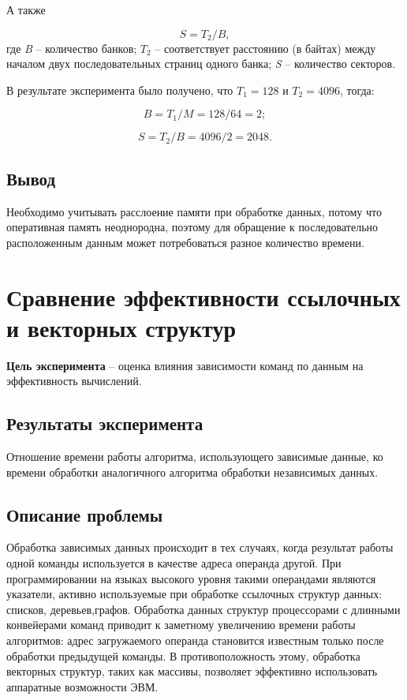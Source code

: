 А также

\begin{equation}
	S = T_2 / B,
\end{equation}
где \textit{B} -- количество банков; $T_2$ -- соответствует расстоянию (в байтах) между началом двух последовательных страниц одного банка; \textit{S} -- количество секторов.


В результате эксперимента было получено, что $T_1 = 128$ и $T_2 = 4096$, тогда:

\begin{equation}
	B = T_1 / M = 128 / 64 = 2;
\end{equation}

\begin{equation}
	S = T_2 / B = 4096 / 2 = 2048.
\end{equation}


\subsection{Вывод}

Необходимо учитывать расслоение памяти при обработке данных, потому что оперативная память неоднородна, поэтому для обращение к последовательно расположенным данным может потребоваться разное количество времени.



\section{Сравнение эффективности ссылочных и векторных структур}

\textbf{Цель эксперимента} -- оценка   влияния   зависимости   команд   по   данным   на эффективность вычислений.

\subsection{Результаты эксперимента}
Отношение времени работы алгоритма, использующего зависимые данные, ко времени обработки аналогичного алгоритма обработки независимых данных.

\subsection{Описание проблемы}
Обработка зависимых данных происходит в тех случаях, когда результат работы одной команды используется в качестве адреса операнда другой. При программировании на языках высокого уровня такими операндами являются указатели, активно используемые при обработке ссылочных структур данных: списков, деревьев,графов. Обработка данных структур процессорами с длинными конвейерами команд приводит к заметному увеличению  времени работы алгоритмов: адрес загружаемого операнда   становится   известным   только   после   обработки   предыдущей   команды.   В противоположность этому, обработка векторных структур, таких как массивы, позволяет эффективно использовать аппаратные возможности ЭВМ.

